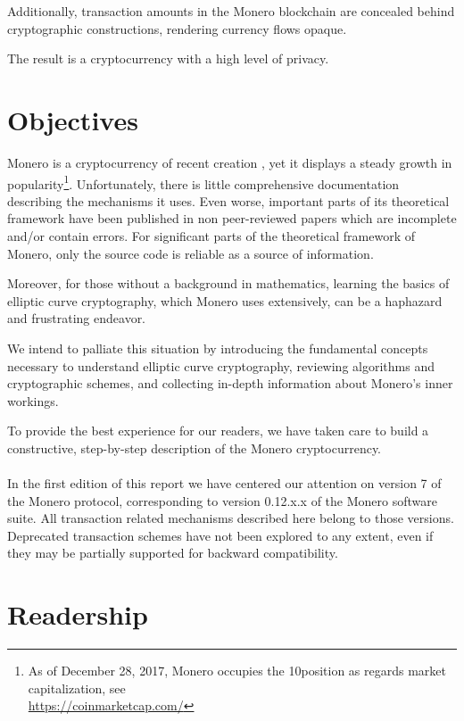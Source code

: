 Additionally, transaction amounts in the Monero blockchain are concealed behind cryptographic constructions, rendering currency flows opaque.

The result is a cryptocurrency with a high level of privacy.




\section{Objectives}
\label{sec:goals}

Monero is a cryptocurrency of recent creation \cite{bitmonero-launched} \cite{monero-history}, yet it displays a steady growth in popularity\footnote{\label{marketcap_note}As of December 28\nth, 2017, Monero occupies the 10\nth position as regards market capitalization, see\\ \url{https://coinmarketcap.com/}}. 
Unfortunately, there is little comprehensive documentation describing the mechanisms it uses. Even worse, important parts of its theoretical framework have been published in non peer-reviewed papers which are incomplete and/or contain errors. For significant parts of the theoretical framework of Monero, only the source code is reliable as a source of information.

Moreover, for those without a background in mathematics, learning the basics of elliptic curve cryptography, which Monero uses extensively, can be a haphazard and frustrating endeavor.

We intend to palliate this situation by introducing the fundamental concepts necessary to understand elliptic curve cryptography, reviewing algorithms and cryptographic schemes, and collecting in-depth information about Monero’s inner workings.

To provide the best experience for our readers, we have taken care to build a constructive, step-by-step description of the Monero cryptocurrency.
\\ 
\\ 

In the first edition of this report we have centered our attention on version 7 of the Monero protocol, corresponding to version 0.12.x.x of the Monero software suite. All transaction related mechanisms described here belong to those versions. Deprecated transaction schemes have not been explored to any extent, even if they may be partially supported for backward compatibility.


\section{Readership}

